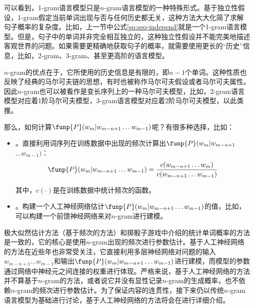 \parinterval 可以看到，1-gram语言模型只是$n$-gram语言模型的一种特殊形式。基于独立性假设，1-gram假定当前单词出现与否与任何历史都无关，这种方法大大化简了求解句子概率的复杂度。比如，上一节中公式\eqref{eq:seq-independ}就是一个1-gram语言模型。但是，句子中的单词并非完全相互独立的，这种独立性假设并不能完美地描述客观世界的问题。如果需要更精确地获取句子的概率，就需要使用更长的“历史”信息，比如，2-gram、3-gram、甚至更高阶的语言模型。

\parinterval $n$-gram的优点在于，它所使用的历史信息是有限的，即$n-1$个单词。这种性质也反映了经典的马尔可夫链的思想，有时也被称作马尔可夫假设或者马尔可夫属性。因此$n$-gram也可以被看作是变长序列上的一种马尔可夫模型，比如，2-gram语言模型对应着1阶马尔可夫模型，3-gram语言模型对应着2阶马尔可夫模型，以此类推。

\parinterval 那么，如何计算$\funp{P}(w_m|w_{m-n+1}  \ldots  w_{m-1})$呢？有很多种选择，比如：

\begin{itemize}
\vspace{0.5em}
\item {\small{}}。直接利用词序列在训练数据中出现的频次计算出$\funp{P}(w_m|w_{m-n+1}$\\$ \ldots  w_{m-1})$：
\begin{eqnarray}
\funp{P}(w_m|w_{m-n+1} \ldots w_{m-1})=\frac{c(w_{m-n+1} \ldots w_m)}{c(w_{m-n+1} \ldots w_{m-1})}
\label{eq:2-24}
\vspace{0.5em}
\end{eqnarray}

\noindent 其中，$c(\cdot)$是在训练数据中统计频次的函数。

\vspace{0.5em}
\item {\small{}}。构建一个人工神经网络估计$\funp{P}(w_m|w_{m-n+1}  \ldots  w_{m-1})$的值，比如，可以构建一个前馈神经网络来对$n$-gram进行建模。
\end{itemize}
\vspace{0.5em}

\parinterval 极大似然估计方法（基于频次的方法）和掷骰子游戏中介绍的统计单词概率的方法是一致的，它的核心是使用$n$-gram出现的频次进行参数估计。基于人工神经网络的方法在近些年也非常受关注，它直接利用多层神经网络对问题的输入$w_{m-n+1} \ldots w_{m-1}$和输出$\funp{P}(w_m|w_{m-n+1}  \ldots  w_{m-1})$进行建模，而模型的参数通过网络中神经元之间连接的权重进行体现。严格来说，基于人工神经网络的方法并不算基于$n$-gram的方法，或者说它并没有显性记录$n$-gram的生成概率，也不依赖$n$-gram的频次进行参数估计。为了保证内容的连贯性，接下来仍以传统$n$-gram语言模型为基础进行讨论，基于人工神经网络的方法将会在{\chapternine}进行详细介绍。

